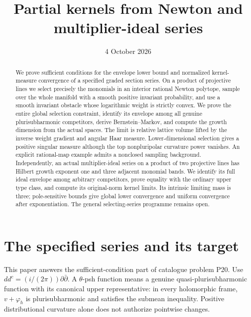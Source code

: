 \documentclass[11pt]{article}
\title{Partial kernels from Newton and multiplier-ideal series}
\author{}
\date{4 October 2026}
\newcommand{\ddc}{dd^c}
\begin{document}
\maketitle
\begin{abstract}
We prove sufficient conditions for the envelope lower bound and normalized
kernel-measure convergence of a specified graded section series. On a
product of projective lines we select precisely the monomials in an interior
rational Newton polytope, sample over the whole manifold with a smooth
positive invariant probability, and use a smooth invariant obstacle whose
logarithmic weight is strictly convex. We prove the entire global selection
constraint, identify its envelope among all genuine plurisubharmonic
competitors, derive Bernstein--Markov, and compute the growth dimension
from the actual spaces. The limit is relative lattice volume lifted by the
inverse weight gradient and angular Haar measure. Lower-dimensional
selection gives a positive singular measure although the top
nonpluripolar curvature power vanishes. An explicit rational-map example
admits a nonclosed sampling background. Independently, an actual
multiplier-ideal series on a product of two projective lines has
Hilbert growth exponent one and three adjacent monomial bands. We
identify its full ideal envelope among arbitrary competitors, prove
equality with the ordinary upper type class, and compute its original-norm
kernel limits. Its intrinsic limiting mass is three; pole-sensitive
bounds give global lower convergence and uniform convergence after
exponentiation. The general selecting-series programme remains open.
\end{abstract}

\section{The specified series and its target}
This paper answers the sufficient-condition part of catalogue problem P20.
Use $\ddc=(i/(2\pi))\partial\bar\partial$. A $\theta$-psh function
means a genuine quasi-plurisubharmonic function with its canonical upper
representative: in every holomorphic frame, $v+\varphi_h$ is
plurisubharmonic and satisfies the submean inequality. Positive
distributional curvature alone does not authorize pointwise changes.
\end{document}
